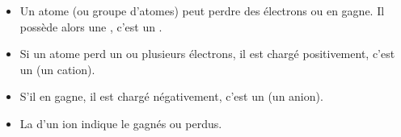 \begin{mybilan}
	\begin{itemize}
		\item Un atome (ou groupe d'atomes) peut perdre des électrons ou en gagne. Il possède alors une , c'est un .\pause
		
		\item Si un atome perd un ou plusieurs électrons, il est chargé positivement, c'est un  (un cation).\pause
		
		\item S'il en gagne, il est chargé négativement, c'est un  (un anion). \pause
		
		\item La  d'un ion indique le  gagnés ou perdus.
	\end{itemize}

\end{mybilan}

